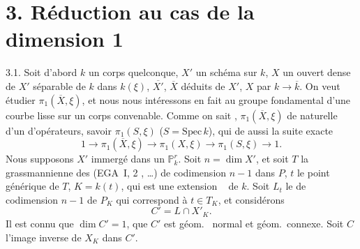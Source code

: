 \documentclass[11pt,a4paper]{article}
\begin{document}

\section*{3. Réduction au cas de la dimension 1}

3.1.  Soit d'abord $k$ un \struck{\ill{}} corps quelconque, $X'$ un schéma   sur $k$, $X$ un ouvert dense de $X'$ séparable de $k$ dans $k(\xi)$, $\overline{X'}$, $\overline{X}$ déduits de $X'$, $X$ par $k \to \overline{k}$.  On veut étudier $\pi_1(\overline{X},\xi)$, et \struck{\ill{}} \ill{} nous nous intéressons en fait au groupe fondamental d'une courbe lisse sur un corps convenable. Comme on sait , $\pi_1(\overline{X},\xi)$   de  naturelle d'un  d'opérateurs,  savoir $\pi_1(S,\xi)$ ($S = \mathrm{Spec}\,k$), qui  de  aussi la suite exacte
\[
  1 \to \pi_1(\overline{X},\xi) \to \pi_1(X,\xi) \to \pi_1(S,\xi) \to 1 . \tag{3.1.1}
\]
 Nous supposons $X'$ immergé dans un $\mathbb{P}^r_k$\struck{\ill{}}. Soit $n = \dim X'$, et soit $T$ la grassmannienne des   (EGA~I, 2\ill{} , …)  de codimension $n-1$ dans $P$, $t$ le point générique de $T$, $K = k(t)$, qui est une extension \  de $k$. Soit $L_t$ le   de codimension $n-1$ de $P_K$ qui correspond à $t \in T_K$, et considérons
\[
  C' = L \cap X'_K .
\]
Il est connu que $\dim C' = 1$, que $C'$ est géom.\  normal et géom.\ connexe. Soit $C$ l'image inverse de $X_K$ dans $C'$.
\end{document}
